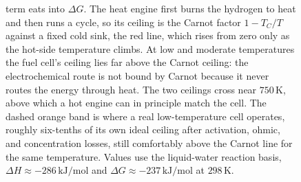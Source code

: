 \begin{figure}[htbp]
{term eats into $\Delta G$. The heat engine first burns the hydrogen to heat and
then runs a cycle, so its ceiling is the Carnot factor $1 - T_C/T$ against a fixed
cold sink, the red line, which rises from zero only as the hot-side temperature
climbs. At low and moderate temperatures the fuel cell's ceiling lies far above the
Carnot ceiling: the electrochemical route is not bound by Carnot because it never
routes the energy through heat. The two ceilings cross near $750\,\si{\kelvin}$,
above which a hot engine can in principle match the cell. The dashed orange band is
where a real low-temperature cell operates, roughly six-tenths of its own ideal
ceiling after activation, ohmic, and concentration losses, still comfortably above
the Carnot line for the same temperature. Values use the liquid-water reaction
basis, $\Delta H \approx -286\,\text{kJ}/\text{mol}$ and $\Delta G \approx
-237\,\text{kJ}/\text{mol}$ at $298\,\si{\kelvin}$.}
\label{fig:vol04ch04:fuelcell-vs-carnot}
\end{figure}
